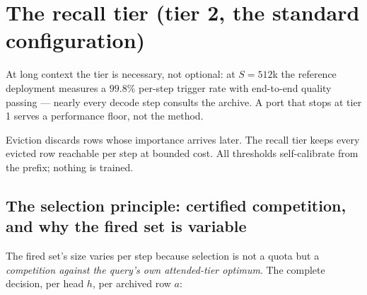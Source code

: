 \documentclass[11pt]{article}
\begin{document}
\section{The recall tier (tier 2, the standard configuration)}
\label{sec:tier2}
At long context the tier is necessary, not optional: at $S{=}512$k the
reference deployment measures a $99.8\%$ per-step trigger rate with
end-to-end quality passing --- nearly every decode step consults the
archive. A port that stops at tier 1 serves a performance floor, not the
method.

Eviction discards rows whose importance arrives later. The recall tier keeps
every evicted row reachable per step at bounded cost. All thresholds
self-calibrate from the prefix; nothing is trained.

\subsection{The selection principle: certified competition, and why the
fired set is variable}\label{sec:whyvar}

The fired set's size varies per step because selection is not a quota but a
\emph{competition against the query's own attended-tier optimum}. The
complete decision, per head $h$, per archived row $a$:
\end{document}
